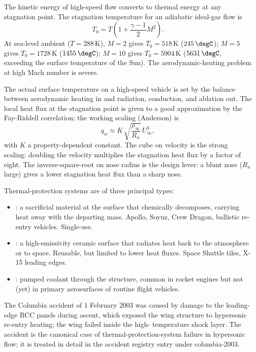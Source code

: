 The kinetic energy of high-speed flow converts to thermal energy
at any stagnation point. The stagnation temperature for an
adiabatic ideal-gas flow is
\[
T_0 = T\left(1 + \frac{\gamma - 1}{2}M^2\right).
\]
At sea-level ambient ($T = 288\,\si{\kelvin}$), $M = 2$ gives
$T_0 = 518\,\si{\kelvin}$ ($245\,\degC$); $M = 5$ gives
$T_0 = 1728\,\si{\kelvin}$ ($1455\,\degC$); $M = 10$ gives $T_0 =
5904\,\si{\kelvin}$ ($5631\,\degC$, exceeding the surface
temperature of the Sun). The aerodynamic-heating problem at high
Mach number is severe.

The actual surface temperature on a high-speed vehicle is set by
the balance between aerodynamic heating in and radiation,
conduction, and ablation out. The local heat flux at the
stagnation point is given to a good approximation by the Fay-Riddell
correlation; the working scaling (Anderson) is
\[
q_w \approx K\,\sqrt{\frac{\rho_\infty}{R_n}}\,U_\infty^3,
\]
with $K$ a property-dependent constant. The cube on velocity is
the strong scaling: doubling the velocity multiplies the
stagnation heat flux by a factor of eight. The inverse-square-root
on nose radius is the design lever: a blunt nose ($R_n$ large)
gives a lower stagnation heat flux than a sharp nose.

Thermal-protection systems are of three principal types:

\begin{itemize}[leftmargin=*]
  \item {}: a sacrificial material at the surface
    that chemically decomposes, carrying heat away with the
    departing mass. Apollo, Soyuz, Crew Dragon, ballistic re-entry
    vehicles. Single-use.
  \item {}: a high-emissivity ceramic surface
    that radiates heat back to the atmosphere or to space.
    Reusable, but limited to lower heat fluxes. Space Shuttle
    tiles, X-15 leading edges.
  \item {}: pumped coolant through the
    structure, common in rocket engines but not (yet) in primary
    aerosurfaces of routine flight vehicles.
\end{itemize}

The Columbia accident of $1$ February $2003$
\cite{acc:caib-columbia} was caused by damage to the leading-edge
RCC panels during ascent, which exposed the wing structure to
hypersonic re-entry heating; the wing failed inside the high-
temperature shock layer. The accident is the canonical case of
thermal-protection-system failure in hypersonic flow; it is
treated in detail in the accident registry entry under
columbia-2003.

